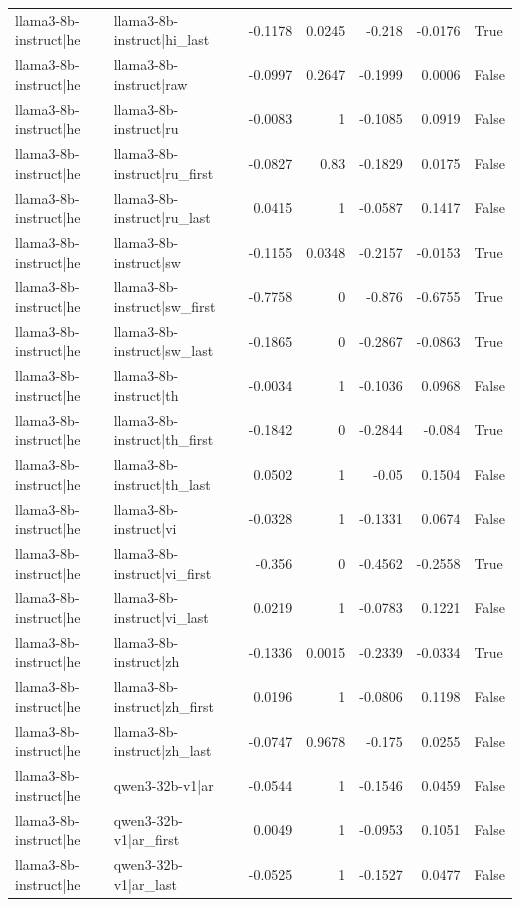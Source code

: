 \begin{table}
\begin{tabular}{l l r r r r l}
llama3-8b-instruct|he & llama3-8b-instruct|hi_last & -0.1178 & 0.0245 & -0.218 & -0.0176 & True \\
llama3-8b-instruct|he & llama3-8b-instruct|raw & -0.0997 & 0.2647 & -0.1999 & 0.0006 & False \\
llama3-8b-instruct|he & llama3-8b-instruct|ru & -0.0083 & 1 & -0.1085 & 0.0919 & False \\
llama3-8b-instruct|he & llama3-8b-instruct|ru_first & -0.0827 & 0.83 & -0.1829 & 0.0175 & False \\
llama3-8b-instruct|he & llama3-8b-instruct|ru_last & 0.0415 & 1 & -0.0587 & 0.1417 & False \\
llama3-8b-instruct|he & llama3-8b-instruct|sw & -0.1155 & 0.0348 & -0.2157 & -0.0153 & True \\
llama3-8b-instruct|he & llama3-8b-instruct|sw_first & -0.7758 & 0 & -0.876 & -0.6755 & True \\
llama3-8b-instruct|he & llama3-8b-instruct|sw_last & -0.1865 & 0 & -0.2867 & -0.0863 & True \\
llama3-8b-instruct|he & llama3-8b-instruct|th & -0.0034 & 1 & -0.1036 & 0.0968 & False \\
llama3-8b-instruct|he & llama3-8b-instruct|th_first & -0.1842 & 0 & -0.2844 & -0.084 & True \\
llama3-8b-instruct|he & llama3-8b-instruct|th_last & 0.0502 & 1 & -0.05 & 0.1504 & False \\
llama3-8b-instruct|he & llama3-8b-instruct|vi & -0.0328 & 1 & -0.1331 & 0.0674 & False \\
llama3-8b-instruct|he & llama3-8b-instruct|vi_first & -0.356 & 0 & -0.4562 & -0.2558 & True \\
llama3-8b-instruct|he & llama3-8b-instruct|vi_last & 0.0219 & 1 & -0.0783 & 0.1221 & False \\
llama3-8b-instruct|he & llama3-8b-instruct|zh & -0.1336 & 0.0015 & -0.2339 & -0.0334 & True \\
llama3-8b-instruct|he & llama3-8b-instruct|zh_first & 0.0196 & 1 & -0.0806 & 0.1198 & False \\
llama3-8b-instruct|he & llama3-8b-instruct|zh_last & -0.0747 & 0.9678 & -0.175 & 0.0255 & False \\
llama3-8b-instruct|he & qwen3-32b-v1|ar & -0.0544 & 1 & -0.1546 & 0.0459 & False \\
llama3-8b-instruct|he & qwen3-32b-v1|ar_first & 0.0049 & 1 & -0.0953 & 0.1051 & False \\
llama3-8b-instruct|he & qwen3-32b-v1|ar_last & -0.0525 & 1 & -0.1527 & 0.0477 & False \\

\end{tabular}
\end{table}
